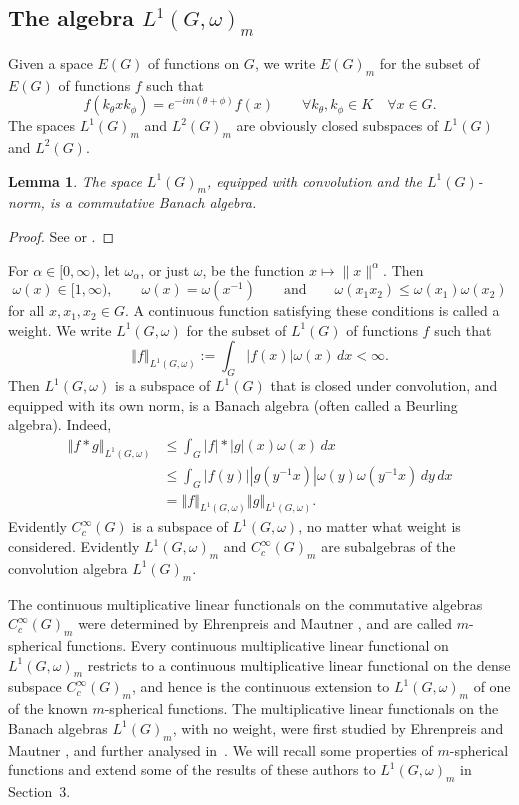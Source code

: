 \documentclass[12pt,a4paper]{amsart}
\newtheorem{lem}[thm]{Lemma}
\theoremstyle{definition}
\theoremstyle{remark}
\numberwithin{equation}{section}
\newcommand{\norm}[1]{\left\Vert#1\right\Vert}
\newcommand{\abs}[1]{\left\vert#1\right\vert}
\begin{document}
\subsection*{The algebra $L^1(G,\omega)_m$}
Given a space $E(G)$ of functions on $G$, we write $E(G)_m$ for  the subset of $E(G)$ of functions $f$ such that
\begin{equation}\label{eq:invariance}
f(k_\theta x k_\phi) = e^{-im(\theta+\phi)} f(x)
\qquad\forall  k_\theta, k_\phi \in K \quad\forall x \in G.
\end{equation}
The spaces $L^1(G)_{m}$ and $L^2(G)_{m}$ are obviously closed subspaces of $L^1(G)$ and $L^2(G)$.

\begin{lem}
The space $L^1(G)_m$, equipped with convolution and the $L^1(G)$-norm, is a commutative Banach algebra.
\end{lem}

\begin{proof}
See \cite[Lemma 3, p.~21]{Lang} or \cite[Proposition 1, p.~290]{T}. 
\end{proof}

For $\alpha \in [0,\infty)$, let $\omega_\alpha$, or just $\omega$, be the function $x \mapsto \|x\|^\alpha$.
Then  
\[
\omega(x) \in [1, \infty),
\qquad
\omega(x) = \omega(x^{-1})
\qquad\text{and}\qquad 
\omega(x_1x_2) \leq \omega(x_1) \omega(x_2)
\]
for all $x, x_1, x_2 \in G$.
A continuous function satisfying these conditions is called a weight.
We write $L^1(G,\omega)$ for the subset of $L^1(G)$ of functions $f$ such that
\[
\norm{f} _{L^1(G,\omega)} := \int_{G} \abs{ f(x) } \omega(x) \,dx < \infty.
\]
Then $L^1(G,\omega)$ is a subspace of $L^1(G)$ that is closed under convolution, and equipped with its own norm, is a Banach algebra (often called a Beurling algebra).
Indeed, 
\[
\begin{aligned}
\norm{ f * g} _{L^1(G,\omega)} 
&\leq \int_G  \abs{ f} * \abs{g} (x) \omega(x) \,dx \\
&\leq \int_G  \abs{ f(y)} \abs{g (y^{-1}x)} \omega(y) \omega(y^{-1}x) \,dy \,dx \\
&= \norm{f} _{L^1(G,\omega)} \norm{g} _{L^1(G,\omega)} .
\end{aligned}
\]
Evidently $C^\infty_c(G)$ is a subspace of $L^1(G,\omega)$, no matter what weight is considered.
Evidently $L^1(G,\omega)_m$ and $C^\infty_c(G)_m$ are subalgebras of the convolution algebra $L^1(G)_m$.


The continuous multiplicative linear functionals on the commutative algebras $C^\infty_c(G)_m$ were determined by Ehrenpreis and Mautner \cite{EMII}, and are called $m$-spherical functions.
Every continuous multiplicative linear functional on $L^1(G,\omega)_m$ restricts to a continuous multiplicative linear functional on the dense subspace $C^\infty_c(G)_m$, and hence is the continuous extension to $L^1(G,\omega)_m$ of one of  the known $m$-spherical functions.
The multiplicative linear functionals on the Banach algebras $L^1(G)_m$, with no weight, were first studied by Ehrenpreis and Mautner \cite[Lemma 7.2]{EMIII}, and further analysed in~\cite{RW, T}. 
We will recall some properties of $m$-spherical functions and extend some of the results of these authors to $L^1(G,\omega)_m$ in Section~3.
\end{document}
